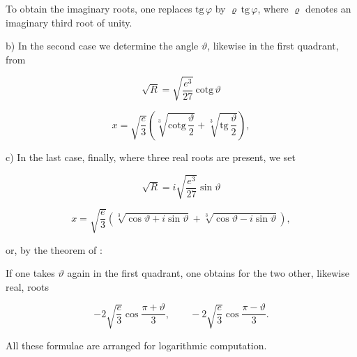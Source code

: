 
To obtain the imaginary roots, one replaces $\mathrm{tg}\,\varphi$ by $\varrho\,\mathrm{tg}\,\varphi$, where $\varrho$ denotes an imaginary third root of unity.

b) In the second case we determine the angle $\vartheta$, likewise in the first quadrant, from


\[
\sqrt{R} = \sqrt{\frac{e^3}{27}}\,\mathrm{cotg}\,\vartheta
\]

\[
x = \sqrt{\frac{e}{3}}\left(\sqrt[3]{\mathrm{cotg}\,\frac{\vartheta}{2}} + \sqrt[3]{\mathrm{tg}\,\frac{\vartheta}{2}}\right),
\]



c) In the last case, finally, where three real roots are present, we set


\[
\sqrt{R} = i\sqrt{\frac{e^3}{27}}\sin\vartheta
\]

\[
x = \sqrt{\frac{e}{3}}\left(\sqrt[3]{\cos\vartheta + i\sin\vartheta} + \sqrt[3]{\cos\vartheta - i\sin\vartheta}\right),
\]

or, by the theorem of :


If one takes $\vartheta$ again in the first quadrant, one obtains for the two other, likewise real, roots

\[
-2\sqrt{\frac{e}{3}}\cos\frac{\pi + \vartheta}{3}, \qquad -2\sqrt{\frac{e}{3}}\cos\frac{\pi - \vartheta}{3}.
\]

All these formulae are arranged for logarithmic computation.
